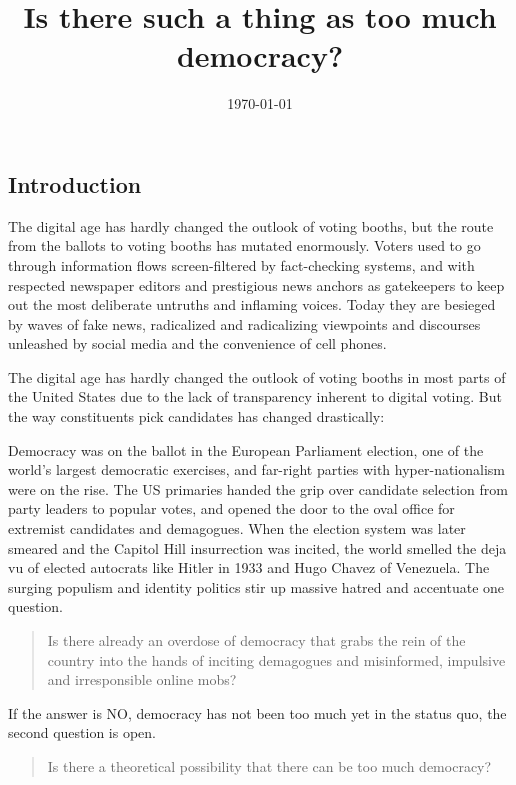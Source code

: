 \documentclass{scrartcl}
\begin{document}
\title{Is there such a thing as too much democracy?}
\author{\today}
\date{}
\maketitle

\subsection*{Introduction}

The digital age has hardly changed the outlook of voting booths, but
the route from the ballots to voting booths has mutated enormously.
Voters used to go through information flows screen-filtered by fact-checking
systems, and with respected newspaper editors and prestigious news
anchors as gatekeepers to keep out the most deliberate untruths and
inflaming voices. Today they are besieged by waves of fake news, radicalized
and radicalizing viewpoints and discourses unleashed by social media
and the convenience of cell phones.

The digital age has hardly changed the outlook of voting booths in most parts of the United States due to the lack of transparency inherent to digital voting. But the way constituents pick candidates has changed drastically: 

Democracy was on the ballot in the European Parliament election, one of the
world’s largest democratic exercises, and far-right parties with
hyper-nationalism were on the rise. The US primaries handed the grip over
candidate selection from party leaders to popular votes, and opened the door to
the oval office for extremist candidates and demagogues. When the election
system was later smeared and the Capitol Hill insurrection was incited, the
world smelled the deja vu of elected autocrats like Hitler in 1933 and Hugo
Chavez of Venezuela. The surging populism and identity politics stir up massive
hatred and accentuate one question.


\begin{quote}
Is there already an overdose of democracy that grabs the rein of the
country into the hands of inciting demagogues and misinformed, impulsive
and irresponsible online mobs? 
\end{quote}
If the answer is NO, democracy has not been too much yet in the status
quo, the second question is open.
\begin{quote}
Is there a theoretical possibility that there can be too much democracy? 
\end{quote}
\end{document}
